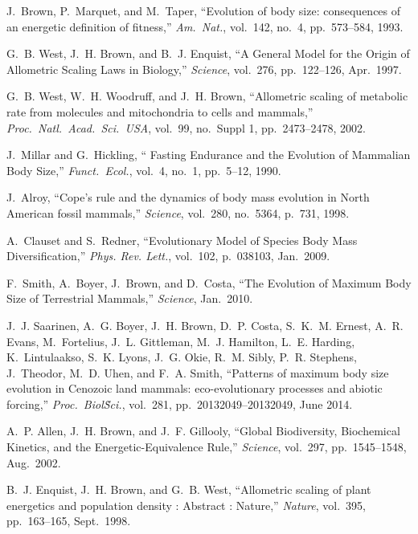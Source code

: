 \documentclass[twocolumn,preprintnumbers,amsmath,amssymb,superscriptaddress]{revtex4}
\begin{document}
{\begin{thebibliography}{10}
 J.~Brown, P.~Marquet, and M.~Taper, ``{Evolution of
    body size: consequences of an energetic definition of fitness},'' {\em
    Am.\ Nat.}, vol.~142, no.~4, pp.~573--584, 1993.

 G.~B. West, J.~H. Brown, and B.~J. Enquist, ``{A
    General Model for the Origin of Allometric Scaling Laws in Biology},''
  {\em Science}, vol.~276, pp.~122--126, Apr.\ 1997.

 G.~B. West, W.~H. Woodruff, and J.~H. Brown,
  ``{Allometric scaling of metabolic rate from molecules and mitochondria to
    cells and mammals},'' {\em Proc.\ Natl.\ Acad.\ Sci.\ USA}, vol.~99,
  no.~Suppl 1, pp.~2473--2478, 2002.

 J.~Millar and G.~Hickling, ``{ Fasting Endurance
    and the Evolution of Mammalian Body Size},'' {\em Funct.\ Ecol.}, vol.~4,
  no.~1, pp.~5--12, 1990.

 J.~Alroy, ``{Cope's rule and the dynamics of body
    mass evolution in North American fossil mammals},'' {\em Science},
  vol.~280, no.~5364, p.~731, 1998.

 A.~Clauset and S.~Redner, ``{Evolutionary Model of
    Species Body Mass Diversification},'' {\em Phys. Rev. Lett.}, vol.~102,
  p.~038103, Jan.\ 2009.

 F.~Smith, A.~Boyer, J.~Brown, and D.~Costa, ``{The
    Evolution of Maximum Body Size of Terrestrial Mammals},'' {\em Science},
  Jan.\ 2010.

 J.~J. Saarinen, A.~G. Boyer, J.~H. Brown,
  D.~P. Costa, S.~K.~M. Ernest, A.~R.  Evans, M.~Fortelius, J.~L. Gittleman,
  M.~J. Hamilton, L.~E. Harding, K.~Lintulaakso, S.~K. Lyons, J.~G. Okie,
  R.~M. Sibly, P.~R. Stephens, J.~Theodor, M.~D. Uhen, and F.~A. Smith,
  ``{Patterns of maximum body size evolution in Cenozoic land mammals:
    eco-evolutionary processes and abiotic forcing},'' {\em Proc.\
    Biol\. Sci.}, vol.~281, pp.~20132049--20132049, June 2014.

 A.~P. Allen, J.~H. Brown, and J.~F. Gillooly, ``{Global
    Biodiversity, Biochemical Kinetics, and the Energetic-Equivalence
    Rule},'' {\em Science}, vol.~297, pp.~1545--1548, Aug.\ 2002.

 B.~J. Enquist, J.~H. Brown, and G.~B. West,
  ``{Allometric scaling of plant energetics and population density : Abstract
    : Nature},'' {\em Nature}, vol.~395, pp.~163--165, Sept.\ 1998.


\end{thebibliography}}
\end{document}
